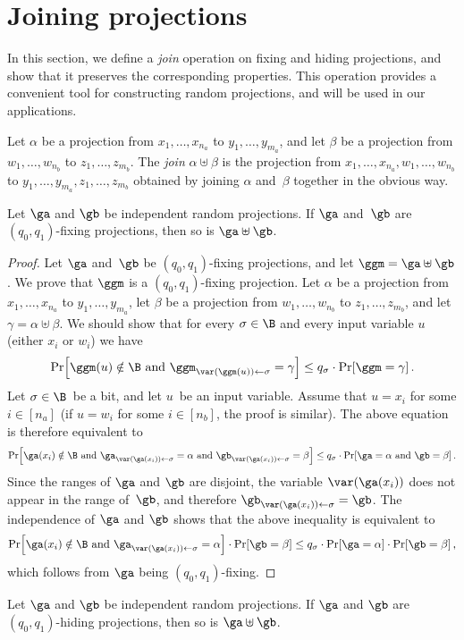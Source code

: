 \section{\label{sec:join}Joining projections}

In this section, we define a \emph{join} operation on fixing and hiding
projections, and show that it preserves the corresponding properties.
This operation provides a convenient tool for constructing random
projections, and will be used in our applications.
\begin{definition}
Let $\alpha$ be a projection from $x_{1},\ldots,x_{n_{a}}$ to $y_{1},\ldots,y_{m_{a}}$,
and let $\beta$ be a projection from $w_{1},\ldots,w_{n_{b}}$ to
$z_{1},\ldots,z_{m_{b}}$. The \emph{join} $\alpha\uplus\beta$ is
the projection from $x_{1},\ldots,x_{n_{a}},w_{1},\ldots,w_{n_{b}}$
to $y_{1},\ldots,y_{m_{a}},z_{1},\ldots,z_{m_{b}}$ obtained by joining
$\alpha$ and~$\beta$ together in the obvious way. 
\end{definition}

\begin{lemma}
\label{lemma:concat-fixing}Let $\ga$ and $\gb$ be independent random
projections. If $\ga$ and~$\gb$ are $(q_{0},q_{1})$-fixing projections,
then so is $\ga\uplus\gb$. 
\end{lemma}

\begin{proof}
Let $\ga$ and~$\gb$ be $(q_{0},q_{1})$-fixing projections, and
let $\ggm=\ga\uplus\gb$. We prove that $\ggm$ is a $(q_{0},q_{1})$-fixing
projection. Let $\alpha$ be a projection from $x_{1},\ldots,x_{n_{a}}$
to $y_{1},\ldots,y_{m_{a}}$, let $\beta$ be a projection from $w_{1},\ldots,w_{n_{b}}$
to $z_{1},\ldots,z_{m_{b}}$, and let $\gamma=\alpha\uplus\beta$.
We should show that for every $\sigma\in\B$ and every input variable
$u$ (either $x_{i}$ or $w_{i}$) we have 
\[
\Pr\!\left[\ggm(u)\notin\B\text{ and }\ggm_{\var(\ggm(u))\gets\sigma}=\gamma\right]\leq q_{\sigma}\cdot\Pr\!\left[\ggm=\gamma\right].
\]
Let $\sigma\in\B$~be a bit, and let $u$~be an input variable.
Assume that $u=x_{i}$ for some $i\in\left[n_{a}\right]$ (if $u=w_{i}$
for some $i\in\left[n_{b}\right]$, the proof is similar). The above
equation is therefore equivalent to 
\[
\Pr\!\left[\ga(x_{i})\notin\B\text{ and }\ga_{\var(\ga(x_{i}))\gets\sigma}=\alpha\text{ and }\gb_{\var(\ga(x_{i}))\gets\sigma}=\beta\right]\leq q_{\sigma}\cdot\Pr\!\left[\ga=\alpha\text{ and }\gb=\beta\right].
\]
Since the ranges of $\ga$ and $\gb$ are disjoint, the variable $\var(\ga(x_{i}))$
does not appear in the range of~$\gb$, and therefore $\gb_{\var(\ga(x_{i}))\gets\sigma}=\gb$.
The independence of $\ga$ and $\gb$ shows that the above inequality
is equivalent to 
\[
\Pr\!\left[\ga(x_{i})\notin\B\text{ and }\ga_{\var(\ga(x_{i}))\gets\sigma}=\alpha\right]\cdot\Pr\!\left[\gb=\beta\right]\leq q_{\sigma}\cdot\Pr\!\left[\ga=\alpha\right]\cdot\Pr\!\left[\gb=\beta\right],
\]
which follows from $\ga$ being $(q_{0},q_{1})$-fixing. 
\end{proof}
\begin{lemma}
\label{lemma:concat-hiding}Let $\ga$ and $\gb$ be independent random
projections. If $\ga$ and $\gb$ are $(q_{0},q_{1})$-hiding projections,
then so is $\ga\uplus\gb$. 
\end{lemma}

